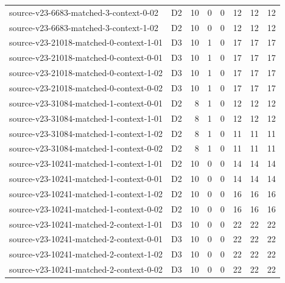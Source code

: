 \begin{longtable}{p{}lrrrrrr}
source-v23-6683-matched-3-context-0-02 & D2 & 10 & 0 & 0 & 12 & 12 & 12\\
source-v23-6683-matched-3-context-1-02 & D2 & 10 & 0 & 0 & 12 & 12 & 12\\
source-v23-21018-matched-0-context-1-01 & D3 & 10 & 1 & 0 & 17 & 17 & 17\\
source-v23-21018-matched-0-context-0-01 & D3 & 10 & 1 & 0 & 17 & 17 & 17\\
source-v23-21018-matched-0-context-1-02 & D3 & 10 & 1 & 0 & 17 & 17 & 17\\
source-v23-21018-matched-0-context-0-02 & D3 & 10 & 1 & 0 & 17 & 17 & 17\\
source-v23-31084-matched-1-context-0-01 & D2 & 8 & 1 & 0 & 12 & 12 & 12\\
source-v23-31084-matched-1-context-1-01 & D2 & 8 & 1 & 0 & 12 & 12 & 12\\
source-v23-31084-matched-1-context-1-02 & D2 & 8 & 1 & 0 & 11 & 11 & 11\\
source-v23-31084-matched-1-context-0-02 & D2 & 8 & 1 & 0 & 11 & 11 & 11\\
source-v23-10241-matched-1-context-1-01 & D2 & 10 & 0 & 0 & 14 & 14 & 14\\
source-v23-10241-matched-1-context-0-01 & D2 & 10 & 0 & 0 & 14 & 14 & 14\\
source-v23-10241-matched-1-context-1-02 & D2 & 10 & 0 & 0 & 16 & 16 & 16\\
source-v23-10241-matched-1-context-0-02 & D2 & 10 & 0 & 0 & 16 & 16 & 16\\
source-v23-10241-matched-2-context-1-01 & D3 & 10 & 0 & 0 & 22 & 22 & 22\\
source-v23-10241-matched-2-context-0-01 & D3 & 10 & 0 & 0 & 22 & 22 & 22\\
source-v23-10241-matched-2-context-1-02 & D3 & 10 & 0 & 0 & 22 & 22 & 22\\
source-v23-10241-matched-2-context-0-02 & D3 & 10 & 0 & 0 & 22 & 22 & 22\\
\end{longtable}
